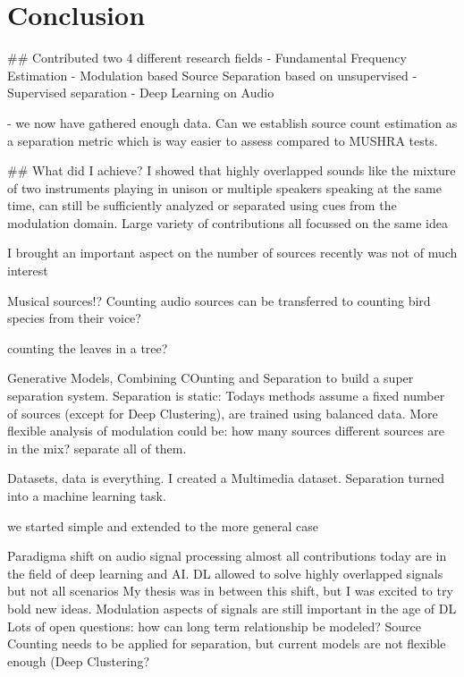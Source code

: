 \chapter{Conclusion}

## Contributed two 4 different research fields
- Fundamental Frequency Estimation
- Modulation based Source Separation based on unsupervised
- Supervised separation
- Deep Learning on Audio

- we now have gathered enough data. Can we establish source count estimation as a separation metric which is way easier to assess compared to MUSHRA tests.

## What did I achieve?
I showed that highly overlapped sounds like the mixture of two instruments playing in unison or multiple speakers speaking at the same time, can still be sufficiently analyzed or separated using cues from the modulation domain. 
Large variety of contributions all focussed on the same idea

I brought an important aspect on the number of sources recently was not of much interest

Musical sources!?
Counting audio sources can be transferred to counting bird species from their voice?

counting the leaves in a tree?

Generative Models, 
Combining COunting and Separation to build a super separation system.
Separation is static: Todays methods assume a fixed number of sources (except for Deep Clustering), are trained using balanced data. More flexible analysis of modulation could be: how many sources different sources are in the mix? separate all of them.

Datasets, data is everything. I created a Multimedia dataset. 
Separation turned into a machine learning task.

we started simple and extended to the more general case

Paradigma shift on audio signal processing almost all contributions today are in the field of deep learning and AI.
DL allowed to solve highly overlapped signals but not all scenarios
My thesis was in between this shift, but I was excited to try bold new ideas. 
Modulation aspects of signals are still important in the age of DL
Lots of open questions: how can long term relationship be modeled?
Source Counting needs to be applied for separation, but current models are not flexible enough (Deep Clustering?

